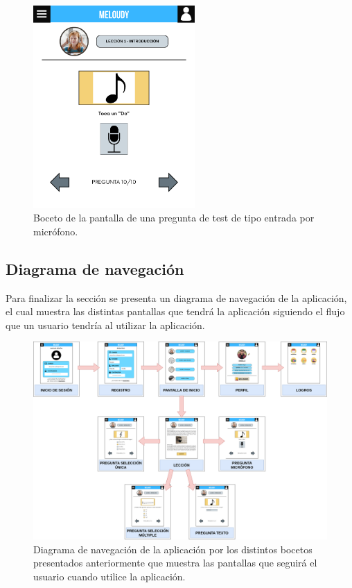 \begin{figure}[H]
    \centering
    \centerline{\includegraphics[width=0.55\textwidth, frame]{imagenes/c6/8.png}}
    \caption{Boceto de la pantalla de una pregunta de test de tipo entrada por micrófono.}
    \label{fig:microfono}
\end{figure}

\newpage

\subsection*{Diagrama de navegación}

Para finalizar la sección se presenta un diagrama de navegación de la aplicación, el cual muestra las distintas pantallas que tendrá la aplicación siguiendo el flujo que un usuario tendría al utilizar la aplicación.
\begin{figure}[H]
    \centering
    \centerline{\includegraphics[width=1.2\textwidth]{imagenes/c6/diagrambocetos.png}}
    \caption{Diagrama de navegación de la aplicación por los distintos bocetos presentados anteriormente que muestra las pantallas que seguirá el usuario cuando utilice la aplicación.}
    \label{fig:diagramanavegacion}
\end{figure}

